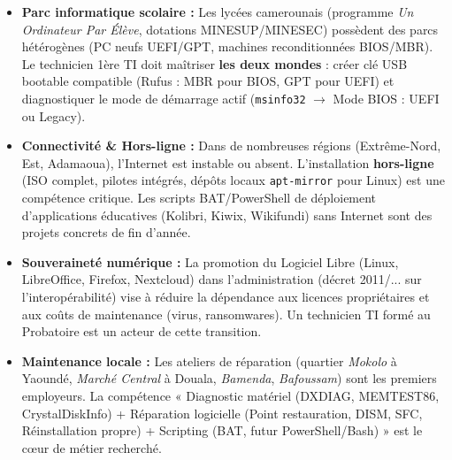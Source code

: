 \documentclass[11pt]{article}
\begin{document}
\begin{savaistu}
\begin{itemize}
  \item \textbf{Parc informatique scolaire :} Les lycées camerounais (programme \emph{Un Ordinateur Par Élève}, dotations MINESUP/MINESEC) possèdent des parcs hétérogènes (PC neufs UEFI/GPT, machines reconditionnées BIOS/MBR). Le technicien 1ère TI doit maîtriser \textbf{les deux mondes} : créer clé USB bootable compatible (Rufus : MBR pour BIOS, GPT pour UEFI) et diagnostiquer le mode de démarrage actif (\texttt{msinfo32} $\rightarrow$ Mode BIOS : UEFI ou Legacy).
  \item \textbf{Connectivité \& Hors-ligne :} Dans de nombreuses régions (Extrême-Nord, Est, Adamaoua), l'Internet est instable ou absent. L'installation \textbf{hors-ligne} (ISO complet, pilotes intégrés, dépôts locaux \texttt{apt-mirror} pour Linux) est une compétence critique. Les scripts BAT/PowerShell de déploiement d'applications éducatives (Kolibri, Kiwix, Wikifundi) sans Internet sont des projets concrets de fin d'année.
  \item \textbf{Souveraineté numérique :} La promotion du Logiciel Libre (Linux, LibreOffice, Firefox, Nextcloud) dans l'administration (décret 2011/... sur l'interopérabilité) vise à réduire la dépendance aux licences propriétaires et aux coûts de maintenance (virus, ransomwares). Un technicien TI formé au Probatoire est un acteur de cette transition.
  \item \textbf{Maintenance locale :} Les ateliers de réparation (quartier \emph{Mokolo} à Yaoundé, \emph{Marché Central} à Douala, \emph{Bamenda}, \emph{Bafoussam}) sont les premiers employeurs. La compétence « Diagnostic matériel (DXDIAG, MEMTEST86, CrystalDiskInfo) + Réparation logicielle (Point restauration, DISM, SFC, Réinstallation propre) + Scripting (BAT, futur PowerShell/Bash) » est le cœur de métier recherché.
\end{itemize}
\end{savaistu}
\end{document}
